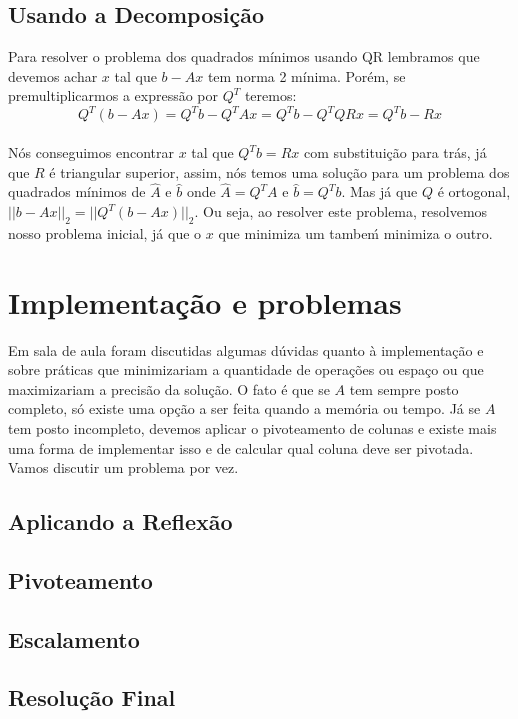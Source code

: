 \documentclass[
10pt, %
a4paper, %
oneside, %
headinclude,footinclude, %
BCOR5mm, %
]{scrartcl}
\begin{document}
\subsection{Usando a Decomposição}
Para resolver o problema dos quadrados mínimos usando QR lembramos que devemos achar $x$ tal que $b-Ax$ tem norma 2 mínima. Porém, se premultiplicarmos a expressão por $Q^T$ teremos: \\
$$ Q^T(b-Ax) = Q^Tb - Q^TAx = Q^Tb - Q^TQRx = Q^Tb - Rx$$ \\
Nós conseguimos encontrar $x$ tal que $Q^Tb = Rx$ com substituição para trás, já que $R$ é triangular superior, assim, nós temos uma solução para um problema dos quadrados mínimos de $\hat{A}$ e $\hat{b}$ onde $\hat{A} = Q^TA$ e $\hat{b} = Q^Tb$. Mas já que $Q$ é ortogonal, $||b-Ax||_2 = ||Q^T(b-Ax)||_2$. Ou seja, ao resolver este problema, resolvemos nosso problema inicial, já que o $x$ que minimiza um tambeḿ minimiza o outro.

\section{Implementação e problemas}
Em sala de aula foram discutidas algumas dúvidas quanto à implementação e sobre práticas que minimizariam a quantidade de operações ou espaço ou que maximizariam a precisão da solução. O fato é que se $A$ tem sempre posto completo, só existe uma opção a ser feita quando a memória ou tempo. Já se $A$ tem posto incompleto, devemos aplicar o pivoteamento de colunas e existe mais uma forma de implementar isso e de calcular qual coluna deve ser pivotada. Vamos discutir um problema por vez.

\subsection{Aplicando a Reflexão}

\subsection{Pivoteamento}

\subsection{Escalamento}

\subsection{Resolução Final}
\end{document}
